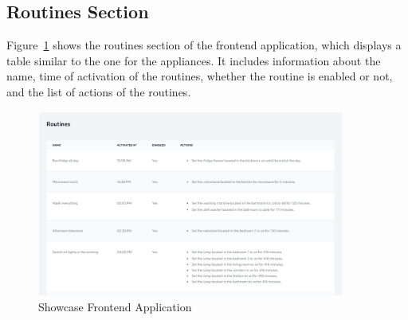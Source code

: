 \subsection{Routines Section}

Figure~\ref{fig:frontend_routines} shows the routines section of the frontend application, which displays a table similar to the one for the appliances. It includes information about the name, time of activation of the routines, whether the routine is enabled or not, and the list of actions of the routines.

\begin{figure}
    \centering
    \includegraphics[width=0.9\textwidth]{images/frontend/routines.png}
    \caption{Showcase Frontend Application}
    \label{fig:frontend_routines}
\end{figure}